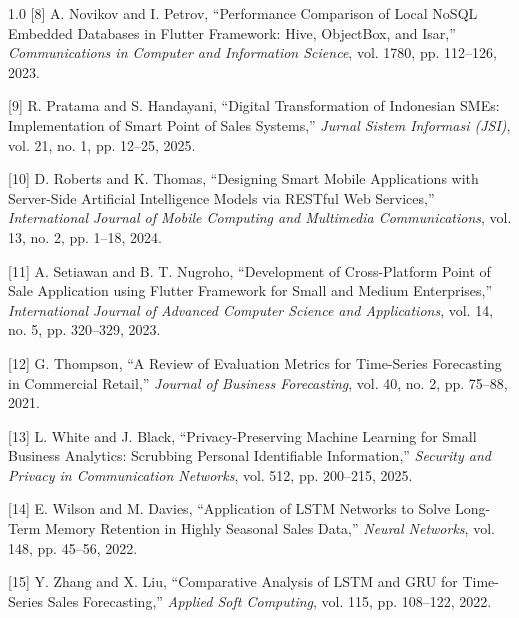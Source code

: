 \documentclass[12pt, a4paper, onecolumn, oneside]{report}
\begin{document}
\begin{spacing}{1.0}
\vspace{0.3cm}
\noindent\hangindent=1.5cm
{[8]} A. Novikov and I. Petrov, ``Performance Comparison of Local NoSQL Embedded Databases in Flutter Framework: Hive, ObjectBox, and Isar,'' \textit{Communications in Computer and Information Science}, vol. 1780, pp. 112--126, 2023.

\vspace{0.3cm}
\noindent\hangindent=1.5cm
{[9]} R. Pratama and S. Handayani, ``Digital Transformation of Indonesian SMEs: Implementation of Smart Point of Sales Systems,'' \textit{Jurnal Sistem Informasi (JSI)}, vol. 21, no. 1, pp. 12--25, 2025.

\vspace{0.3cm}
\noindent\hangindent=1.5cm
{[10]} D. Roberts and K. Thomas, ``Designing Smart Mobile Applications with Server-Side Artificial Intelligence Models via RESTful Web Services,'' \textit{International Journal of Mobile Computing and Multimedia Communications}, vol. 13, no. 2, pp. 1--18, 2024.

\vspace{0.3cm}
\noindent\hangindent=1.5cm
{[11]} A. Setiawan and B. T. Nugroho, ``Development of Cross-Platform Point of Sale Application using Flutter Framework for Small and Medium Enterprises,'' \textit{International Journal of Advanced Computer Science and Applications}, vol. 14, no. 5, pp. 320--329, 2023.

\vspace{0.3cm}
\noindent\hangindent=1.5cm
{[12]} G. Thompson, ``A Review of Evaluation Metrics for Time-Series Forecasting in Commercial Retail,'' \textit{Journal of Business Forecasting}, vol. 40, no. 2, pp. 75--88, 2021.

\vspace{0.3cm}
\noindent\hangindent=1.5cm
{[13]} L. White and J. Black, ``Privacy-Preserving Machine Learning for Small Business Analytics: Scrubbing Personal Identifiable Information,'' \textit{Security and Privacy in Communication Networks}, vol. 512, pp. 200--215, 2025.

\vspace{0.3cm}
\noindent\hangindent=1.5cm
{[14]} E. Wilson and M. Davies, ``Application of LSTM Networks to Solve Long-Term Memory Retention in Highly Seasonal Sales Data,'' \textit{Neural Networks}, vol. 148, pp. 45--56, 2022.

\vspace{0.3cm}
\noindent\hangindent=1.5cm
{[15]} Y. Zhang and X. Liu, ``Comparative Analysis of LSTM and GRU for Time-Series Sales Forecasting,'' \textit{Applied Soft Computing}, vol. 115, pp. 108--122, 2022.

\end{spacing}
\end{document}
